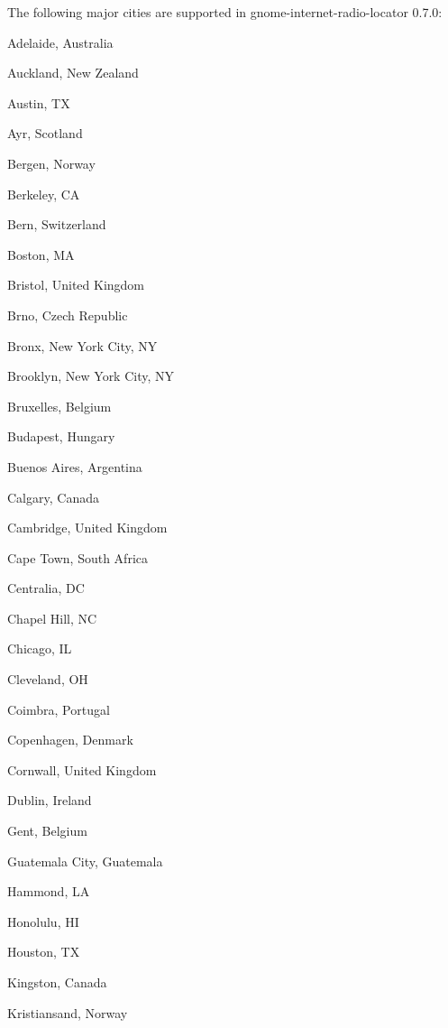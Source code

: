\documentclass[20pt,landscape]{foils}
\begin{document}

The following major cities are supported in gnome-internet-radio-locator 0.7.0:

\begin{list1}
\item
  \begin{list2}
    \item Adelaide, Australia
    \item Auckland, New Zealand
    \item Austin, TX
    \item Ayr, Scotland
    \item Bergen, Norway
    \item Berkeley, CA
    \item Bern, Switzerland
    \item Boston, MA
    \item Bristol, United Kingdom
    \item Brno, Czech Republic
    \item Bronx, New York City, NY
    \item Brooklyn, New York City, NY
    \item Bruxelles, Belgium
    \item Budapest, Hungary
    \item Buenos Aires, Argentina
    \item Calgary, Canada
    \item Cambridge, United Kingdom
    \item Cape Town, South Africa
    \item Centralia, DC
    \item Chapel Hill, NC
    \item Chicago, IL
    \item Cleveland, OH
    \item Coimbra, Portugal
    \item Copenhagen, Denmark
    \item Cornwall, United Kingdom
    \item Dublin, Ireland
    \item Gent, Belgium
    \item Guatemala City, Guatemala
    \item Hammond, LA
    \item Honolulu, HI
    \item Houston, TX
    \item Kingston, Canada
    \item Kristiansand, Norway

\end{list2}
\end{list1}
\end{document}
